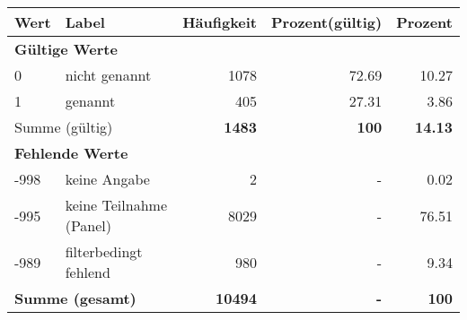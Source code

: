      \begin{longtable}{lXrrr}
     \toprule
     \textbf{Wert} & \textbf{Label} & \textbf{Häufigkeit} & \textbf{Prozent(gültig)} & \textbf{Prozent} \\
     \endhead
     \midrule
     \multicolumn{5}{l}{\textbf{Gültige Werte}}\\

     0 &
     \multicolumn{1}{X}{ nicht genannt   } &


       \num{1078} &
       \num[round-mode=places,round-precision=2]{72,69} &
         \num[round-mode=places,round-precision=2]{10,27} \\

     1 &
     \multicolumn{1}{X}{ genannt   } &


       \num{405} &
       \num[round-mode=places,round-precision=2]{27,31} &
         \num[round-mode=places,round-precision=2]{3,86} \\
     \midrule
     \multicolumn{2}{l}{Summe (gültig)} &
       \textbf{\num{1483}} &
     \textbf{100} &
       \textbf{\num[round-mode=places,round-precision=2]{14,13}} \\
     \multicolumn{5}{l}{\textbf{Fehlende Werte}}\\
       -998 &
       keine Angabe &
         \num{2} &
        - &
         \num[round-mode=places,round-precision=2]{0,02} \\
       -995 &
       keine Teilnahme (Panel) &
         \num{8029} &
        - &
         \num[round-mode=places,round-precision=2]{76,51} \\
       -989 &
       filterbedingt fehlend &
         \num{980} &
        - &
         \num[round-mode=places,round-precision=2]{9,34} \\
     \midrule
     \multicolumn{2}{l}{\textbf{Summe (gesamt)}} &
          \textbf{\num{10494}} &
        \textbf{-} &
        \textbf{100} \\
     \bottomrule
     \end{longtable}
     
